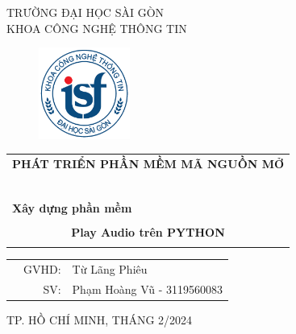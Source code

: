 \documentclass[a4paper]{article}
\begin{document}
\begin{titlepage}
\begin{center}
TRƯỜNG ĐẠI HỌC SÀI GÒN \\
KHOA CÔNG NGHỆ THÔNG TIN
\end{center}
\vspace{1cm}

\begin{figure}[h!]
\begin{center}
\includegraphics[width=3cm]{logoITSGU.png}
\end{center}
\end{figure}

\vspace{1cm}


\begin{center}
\begin{tabular}{c}
	\multicolumn{1}{l}{\textbf{{\Large PHÁT TRIỂN PHẦN MỀM MÃ NGUỒN MỞ}}}\\
	~~\\
	\hline
	\\
	\multicolumn{1}{l}{\textbf{{\Large Xây dựng phần mềm}}}\\
	\\
	
	\textbf{{\Huge Play Audio trên PYTHON}}\\
	\\
	\hline
\end{tabular}
\end{center}

\vspace{3cm}

\begin{table}[h]
\begin{tabular}{rrl}
\hspace{5 cm} & GVHD: &Từ Lãng Phiêu\\
& SV: & Phạm Hoàng Vũ - 3119560083\\
\end{tabular}
\vspace{1.5 cm}
\end{table}

\begin{center}

{\footnotesize TP. HỒ CHÍ MINH, THÁNG 2/2024}
\end{center}
\end{titlepage}
\end{document}

